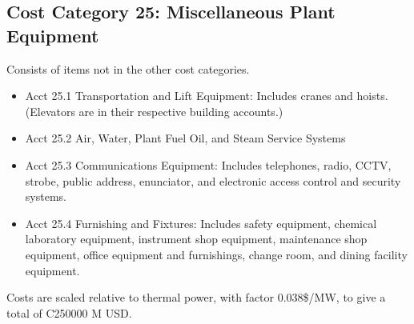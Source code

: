 \subsection{Cost Category 25: Miscellaneous Plant Equipment}  %

Consists of items not in the other cost categories.

\begin{itemize}

\item Acct 25.1 Transportation and Lift Equipment: Includes cranes and hoists. (Elevators are
in their respective building accounts.)

\item  Acct 25.2 Air, Water, Plant Fuel Oil, and Steam Service Systems

\item  Acct 25.3 Communications Equipment: Includes telephones, radio, CCTV, strobe, public
address, enunciator, and electronic access control and security systems.

\item  Acct 25.4 Furnishing and Fixtures: Includes safety equipment, chemical laboratory
equipment, instrument shop equipment, maintenance shop equipment, office
equipment and furnishings, change room, and dining facility equipment.

\end{itemize}

Costs are scaled relative to thermal power, with factor 0.038\$/MW, to give a total of C250000 M USD. 